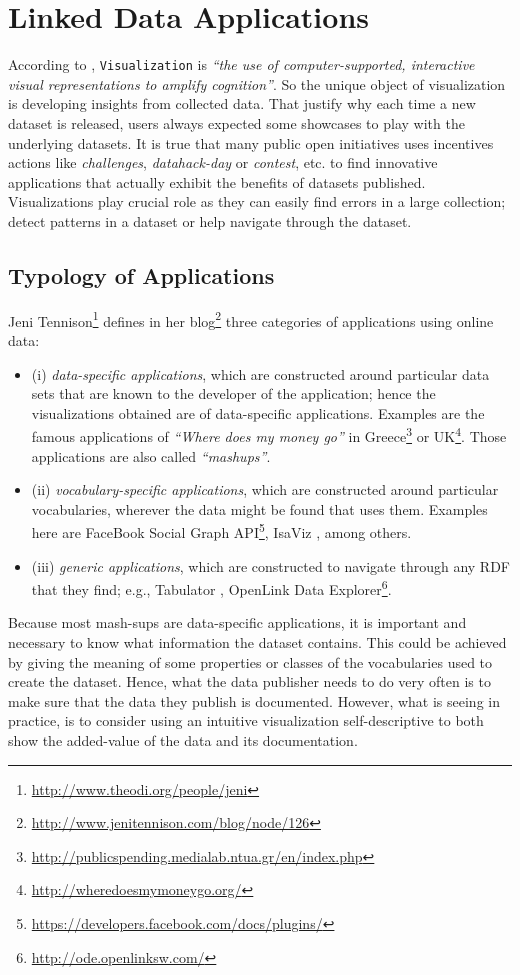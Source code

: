 \section{Linked Data Applications} 
\label{sec:apps}
According to \cite{card99}, \texttt{Visualization} is \textit{ ``the use of computer-supported, interactive visual representations to amplify cognition''}. So the unique object of visualization is developing insights from collected data. That justify why each time a new dataset is released, users always expected some showcases to play with the underlying datasets. It is true that many public open initiatives uses incentives actions like \textit{challenges}, \textit{datahack-day} or \textit{contest}, etc. to find innovative applications that actually exhibit the benefits of datasets published. Visualizations play crucial role as they can easily find errors in a large collection; detect patterns in a dataset or help navigate through the dataset. 

\subsection{Typology of Applications}
Jeni Tennison\footnote{\url{http://www.theodi.org/people/jeni}} defines  in her blog\footnote{\url{http://www.jenitennison.com/blog/node/126}} three categories of applications using online data:
\begin{itemize}
\item (i) \textit{data-specific applications}, which are constructed around particular data sets that are known to the developer of the application; hence the visualizations obtained are of data-specific applications. Examples are the famous applications of \textit{``Where does my money go''}  in Greece\footnote{\url{http://publicspending.medialab.ntua.gr/en/index.php}} or UK\footnote{\url{http://wheredoesmymoneygo.org/}}. Those applications are also called \textit{``mashups''}. 
\item (ii) \textit{vocabulary-specific applications}, which are constructed around particular vocabularies, wherever the data might be found that uses them. Examples here are FaceBook Social Graph API\footnote{\url{https://developers.facebook.com/docs/plugins/}}, IsaViz  \cite{isaviz}, among others.
\item (iii) \textit{generic applications}, which are constructed to navigate through any RDF that they find; e.g., Tabulator \cite{tabulator06}, OpenLink Data Explorer\footnote{\url{http://ode.openlinksw.com/}}. 

\end{itemize}
Because most mash-sups are data-specific applications, it is important and necessary to  know what information the dataset contains. This could be achieved by giving the meaning of some properties or classes of the vocabularies used to create the dataset. Hence, what the data publisher needs to do very often is to make sure that the data they publish is documented. However, what is seeing in practice, is to consider using an intuitive visualization self-descriptive to both show the added-value of the data and its documentation.

